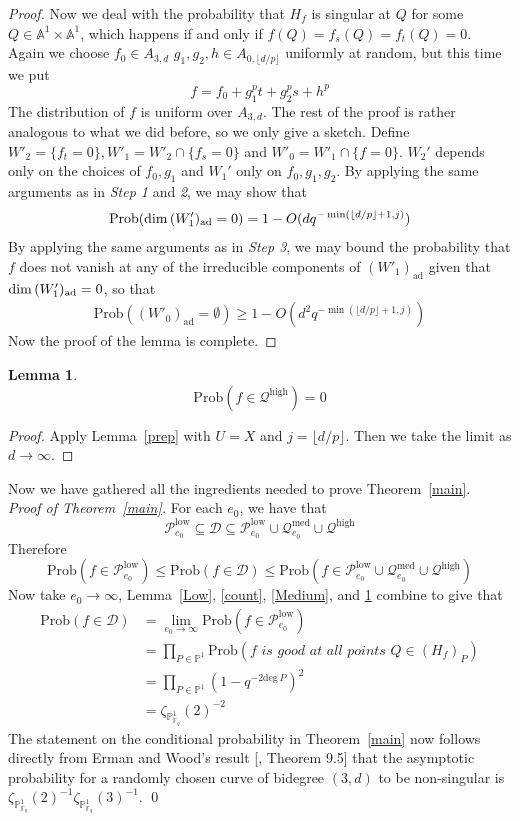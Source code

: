 \documentclass[12pt]{article}
\theoremstyle{plain}
\newtheorem{lemma}[equation]{Lemma}
\theoremstyle{definition}
\newcommand{\IA}{\mathbb{A}}
\newcommand{\IF}{\mathbb{F}}
\newcommand{\IP}{\mathbb{P}}
\newcommand{\sD}{\mathcal{D}}
\newcommand{\sP}{\mathcal{P}}
\newcommand{\sQ}{\mathcal{Q}}
\renewcommand{\deg}{\mathrm{deg}\,}
\renewcommand\dim{{\rm dim\,}}
\newcommand{\<}{\langle}
\renewcommand{\>}{\rangle}
\newcommand{\Prob}{\mathrm{Prob}}
\newcommand{\ad}{\mathrm{ad}}
\begin{document}
\begin{proof}
Now we deal with the probability that $H_f$ is singular at $Q$ for some $Q \in \IA^1 \times \IA^1$, which happens if and only if $f(Q) = f_s(Q) = f_t(Q) = 0$. Again we choose $f_0 \in A_{3, d}$  $g_1, g_2, h \in A_{0, \lfloor d/p \rfloor}$ uniformly at random, but this time we put
$$ f = f_0 + g_1^p t + g_2^p s + h^p $$
The distribution of $f$ is uniform over $A_{3, d}$. The rest of the proof is rather analogous to what we did before, so we only give a sketch. Define $W'_2 = \{f_{t} = 0 \}, W'_1 = W'_2 \cap \{ f_s = 0 \}$ and $W'_0 = W'_1 \cap \{ f = 0 \}$. $W_2'$ depends only on the choices of $f_0, g_1$ and $W_1'$ only on $f_0, g_1, g_2$. By applying the same arguments as in \textit{Step 1} and \textit{2}, we may show that 
\begin{align*} \Prob(\dim (W'_1)_{\ad} = 0) = 1 - O(d q^{- \min(\lfloor d/p \rfloor + 1, j)}) \end{align*}
By applying the same arguments as in \textit{Step 3}, we may bound the probability that $f$ does not vanish at any of the irreducible components of $(W'_1)_{\ad}$ given that $\dim (W'_1)_{\ad} = 0$, so that 
\begin{align*}
\Prob((W'_0)_{\ad} = \emptyset) \ge 1 - O(d^2 q^{- \min(\lfloor d/p \rfloor + 1, j)}) 
\end{align*}
Now the proof of the lemma is complete.
\end{proof}


\begin{lemma}
\label{High}
$$\Prob( f \in  \sQ^{\mathrm{high}}) = 0 $$
\end{lemma}
\begin{proof}
Apply Lemma~\ref{prep} with $U = X$ and $j = \lfloor d/p \rfloor$. Then we take the limit as $d \to \infty$. 
\end{proof}
Now we have gathered all the ingredients needed to prove Theorem~\ref{main}. \\
\noindent \textit{Proof of Theorem~\ref{main}.} 
For each $e_0$, we have that 
$$  \sP_{e_0}^{\mathrm{low}} \subseteq \sD \subseteq \sP_{e_0}^{\mathrm{low}} \cup \sQ_{e_0}^{\mathrm{med}} \cup \sQ^{\mathrm{high}}$$
Therefore 
$$ \Prob(f \in \sP_{e_0}^{\mathrm{low}}) \le \Prob(f \in \sD) \le \Prob(f \in \sP_{e_0}^{\mathrm{low}} \cup \sQ_{e_0}^{\mathrm{med}} \cup \sQ^{\mathrm{high}})$$
Now take $e_0 \to \infty$, Lemma~\ref{Low}, \ref{count}, \ref{Medium}, and \ref{High} combine to give that 
\begin{align*}
\Prob(f \in \sD) &= \lim_{e_0 \to \infty} \Prob(f \in \sP_{e_0}^{\mathrm{low}}) \\
&= \prod_{P \in \IP^1} \Prob( f \textit{ is good at all points } Q \in (H_f)_P ) \\
&= \prod_{P \in \IP^1} (1 - q^{-2 \deg P})^{2} \\
&= \zeta_{\IP^1_{\IF_q}}(2)^{-2}
\end{align*}
The statement on the conditional probability in Theorem~\ref{main} now follows directly from Erman and Wood's result [\cite{Wood}, Theorem 9.5] that the asymptotic probability for a randomly chosen curve of bidegree $(3, d)$ to be non-singular is $\zeta_{\IP^1_{\IF_q}}(2)^{-1}\zeta_{\IP^1_{\IF_q}}(3)^{-1}$. \qed
\end{document}
